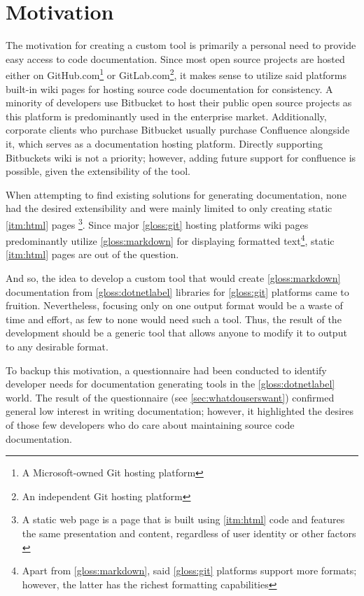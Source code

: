 \section*{Motivation}

The motivation for creating a custom tool is primarily a personal need to provide easy access to code documentation. Since most open source projects are hosted either on GitHub.com\footnote{A Microsoft-owned Git hosting platform} or GitLab.com\footnote{An independent Git hosting platform}, it makes sense to utilize said platforms built-in wiki pages for hosting source code documentation for consistency. A minority of developers use Bitbucket to host their public open source projects as this platform is predominantly used in the enterprise market. Additionally, corporate clients who purchase Bitbucket usually purchase Confluence alongside it, which serves as a documentation hosting platform. Directly supporting Bitbuckets wiki is not a priority; however, adding future support for confluence is possible, given the extensibility of the tool.

When attempting to find existing solutions for generating documentation, none had the desired extensibility and were mainly limited to only creating static \ref{itm:html} pages
\footnote{A static web page is a page that is built using \ref{itm:html} code and features the same presentation and content, regardless of user identity or other factors \cite{techopedia_what_2017}}.
Since major \ref{gloss:git} hosting platforms wiki pages predominantly utilize \ref{gloss:markdown} for displaying formatted text\footnote{Apart from \ref{gloss:markdown}, said \ref{gloss:git} platforms support more formats; however, the latter has the richest formatting capabilities}, static \ref{itm:html} pages are out of the question.

And so, the idea to develop a custom tool that would create \ref{gloss:markdown} documentation from \ref{gloss:dotnetlabel} libraries for \ref{gloss:git} platforms came to fruition. Nevertheless, focusing only on one output format would be a waste of time and effort, as few to none would need such a tool. Thus, the result of the development should be a generic tool that allows anyone to modify it to output to any desirable format.

To backup this motivation, a questionnaire had been conducted to identify developer needs for documentation generating tools in the \ref{gloss:dotnetlabel} world. The result of the questionnaire (see \ref{sec:whatdouserswant}) confirmed general low interest in writing documentation; however, it highlighted the desires of those few developers who do care about maintaining source code documentation.

